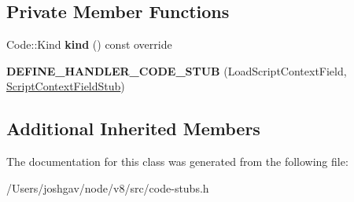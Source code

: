 \subsection*{Private Member Functions}
\begin{DoxyCompactItemize}
\item 
Code\+::\+Kind {\bfseries kind} () const  override\hypertarget{classv8_1_1internal_1_1_load_script_context_field_stub_a686564a6dc4731648f83c0d6303993bf}{}\label{classv8_1_1internal_1_1_load_script_context_field_stub_a686564a6dc4731648f83c0d6303993bf}

\item 
{\bfseries D\+E\+F\+I\+N\+E\+\_\+\+H\+A\+N\+D\+L\+E\+R\+\_\+\+C\+O\+D\+E\+\_\+\+S\+T\+UB} (Load\+Script\+Context\+Field, \hyperlink{classv8_1_1internal_1_1_script_context_field_stub}{Script\+Context\+Field\+Stub})\hypertarget{classv8_1_1internal_1_1_load_script_context_field_stub_a1efbce383a0f398f695f588928d19232}{}\label{classv8_1_1internal_1_1_load_script_context_field_stub_a1efbce383a0f398f695f588928d19232}

\end{DoxyCompactItemize}
\subsection*{Additional Inherited Members}


The documentation for this class was generated from the following file\+:\begin{DoxyCompactItemize}
\item 
/\+Users/joshgav/node/v8/src/code-\/stubs.\+h\end{DoxyCompactItemize}
